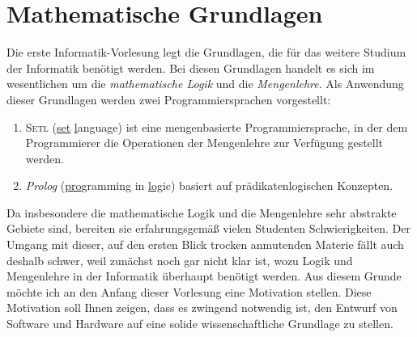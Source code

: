 \chapter{Mathematische Grundlagen} 
Die erste Informatik-Vorlesung legt die Grundlagen, die für das weitere Studium
der Informatik benötigt werden.  Bei diesen Grundlagen handelt es sich im wesentlichen
um die \emph{mathematische Logik} und die \emph{Mengenlehre}.  
Als Anwendung dieser Grundlagen werden zwei Programmiersprachen vorgestellt:
\begin{enumerate}
\item \textsc{Setl} (\underline{set} \underline{l}anguage) ist eine mengenbasierte
      Programmiersprache, in der dem Programmierer 
      die Operationen der Mengenlehre zur Verfügung gestellt werden.
\item \textsl{Prolog} (\underline{pro}gramming in \underline{log}ic) basiert
      auf prädikatenlogischen Konzepten.
\end{enumerate}
Da insbesondere die mathematische Logik und die
Mengenlehre sehr abstrakte Gebiete sind, bereiten sie erfahrungsgemäß vielen Studenten
Schwierigkeiten.  Der Umgang mit dieser, auf den ersten Blick trocken anmutenden Materie fällt
auch deshalb schwer, weil zunächst noch gar nicht klar ist, wozu Logik und Mengenlehre in der
Informatik überhaupt benötigt werden.  Aus diesem Grunde möchte ich an den Anfang dieser
Vorlesung eine Motivation stellen. Diese Motivation soll Ihnen zeigen, dass es zwingend
notwendig ist, den Entwurf von Software und Hardware auf eine solide wissenschaftliche
Grundlage zu stellen. 

